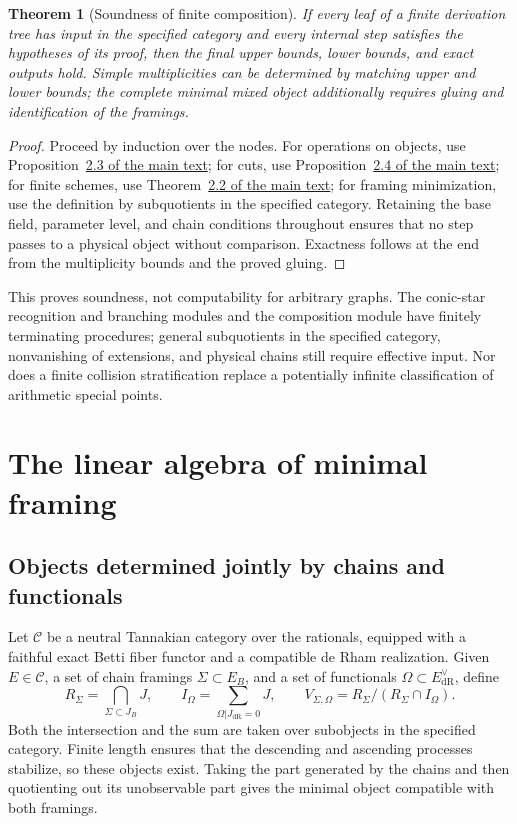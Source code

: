 \documentclass[11pt,a4paper,oneside]{article}
\theoremstyle{plain}
\newtheorem{theorem}{Theorem}[section]
\theoremstyle{definition}
\theoremstyle{remark}
\newcommand{\dR}{\mathrm{dR}}
\numberwithin{equation}{section}
\newcommand{\otherref}[2]{\href{#1.pdf}{#2}}
\begin{document}
\begin{theorem}[Soundness of finite composition]
If every leaf of a finite derivation tree has input in the specified category and every internal step satisfies the hypotheses of its proof,
then the final upper bounds, lower bounds, and exact outputs hold.
Simple multiplicities can be determined by matching upper and lower bounds; the complete minimal mixed object additionally requires gluing and identification of the framings.
\end{theorem}
\begin{proof}
Proceed by induction over the nodes. For operations on objects, use Proposition~\otherref{feynman_periods_long_paper_en}{2.3 of the main text};
for cuts, use Proposition~\otherref{feynman_periods_long_paper_en}{2.4 of the main text};
for finite schemes, use Theorem~\otherref{feynman_periods_long_paper_en}{2.2 of the main text};
for framing minimization, use the definition by subquotients in the specified category.
Retaining the base field, parameter level, and chain conditions throughout ensures that no step passes to a physical object without comparison.
Exactness follows at the end from the multiplicity bounds and the proved gluing.
\end{proof}
This proves soundness, not computability for arbitrary graphs.
The conic-star recognition and branching modules and the composition module have finitely terminating procedures;
general subquotients in the specified category, nonvanishing of extensions, and physical chains still require effective input.
Nor does a finite collision stratification replace a potentially infinite classification of arithmetic special points.


\endgroup


\section{The linear algebra of minimal framing}\label{ch:frames}

\begingroup

\subsection{Objects determined jointly by chains and functionals}
Let $\mathcal C$ be a neutral Tannakian category over the rationals, equipped with a faithful exact Betti fiber functor and a compatible de Rham realization. Given $E\in\mathcal C$, a set of chain framings $\Sigma\subset E_B$, and a set of functionals $\Omega\subset E_{\dR}^{\vee}$, define
\begin{equation}\label{eq:visible}
 R_\Sigma=\bigcap_{\Sigma\subset J_B}J,\qquad
 I_\Omega=\sum_{\Omega|J_{\dR}=0}J,\qquad
 V_{\Sigma,\Omega}=R_\Sigma/(R_\Sigma\cap I_\Omega).
\end{equation}
Both the intersection and the sum are taken over subobjects in the specified category. Finite length ensures that the descending and ascending processes stabilize, so these objects exist. Taking the part generated by the chains and then quotienting out its unobservable part gives the minimal object compatible with both framings.
\end{document}
